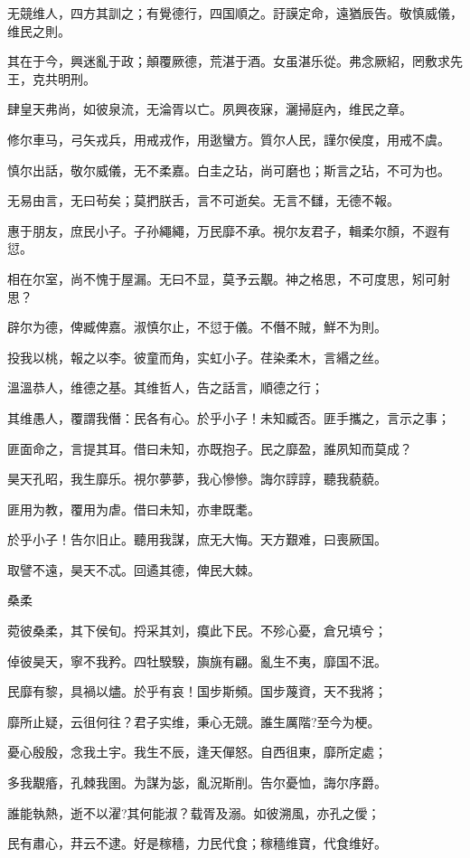 无競维人，四方其訓之；有覺德行，四国順之。訏謨定命，遠猶辰告。敬慎威儀，维民之則。

其在于今，興迷亂于政；顛覆厥德，荒湛于酒。女虽湛乐從。弗念厥紹，罔敷求先王，克共明刑。

肆皇天弗尚，如彼泉流，无淪胥以亡。夙興夜寐，灑掃庭內，维民之章。

修尔車马，弓矢戎兵，用戒戎作，用逖蠻方。質尔人民，謹尔侯度，用戒不虞。

慎尔出話，敬尔威儀，无不柔嘉。白圭之玷，尚可磨也；斯言之玷，不可为也。

无易由言，无曰茍矣；莫捫朕舌，言不可逝矣。无言不讎，无德不報。

惠于朋友，庶民小子。子孙繩繩，万民靡不承。視尔友君子，輯柔尔顏，不遐有愆。

相在尔室，尚不愧于屋漏。无曰不显，莫予云覯。神之格思，不可度思，矧可射思？

辟尔为德，俾臧俾嘉。淑慎尔止，不愆于儀。不僭不賊，鮮不为則。

投我以桃，報之以李。彼童而角，实虹小子。荏染柔木，言緡之丝。

溫溫恭人，维德之基。其维哲人，告之話言，順德之行；

其维愚人，覆謂我僭：民各有心。於乎小子！未知臧否。匪手攜之，言示之事；

匪面命之，言提其耳。借曰未知，亦既抱子。民之靡盈，誰夙知而莫成？

昊天孔昭，我生靡乐。視尔夢夢，我心慘慘。誨尔諄諄，聽我藐藐。

匪用为教，覆用为虐。借曰未知，亦聿既耄。

於乎小子！告尔旧止。聽用我謀，庶无大悔。天方艱难，曰喪厥国。

取譬不遠，昊天不忒。回遹其德，俾民大棘。

桑柔

菀彼桑柔，其下侯旬。捋采其刘，瘼此下民。不殄心憂，倉兄填兮；

倬彼昊天，寧不我矜。四牡騤騤，旟旐有翩。亂生不夷，靡国不泯。

民靡有黎，具禍以燼。於乎有哀！国步斯頻。国步蔑資，天不我將；

靡所止疑，云徂何往？君子实维，秉心无競。誰生厲階?至今为梗。

憂心殷殷，念我土宇。我生不辰，逢天僤怒。自西徂東，靡所定處；

多我覯痻，孔棘我圉。为謀为毖，亂況斯削。告尔憂恤，誨尔序爵。

誰能執熱，逝不以濯?其何能淑？载胥及溺。如彼溯風，亦孔之僾；

民有肅心，荓云不逮。好是稼穡，力民代食；稼穡维寶，代食维好。

